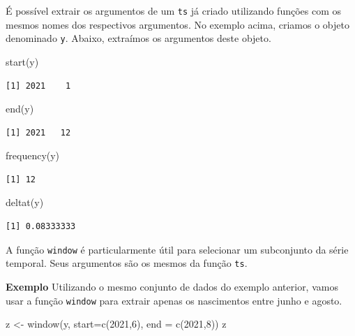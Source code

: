 \documentclass[
  letterpaper,
  DIV=11,
  numbers=noendperiod]{scrreprt}
\newenvironment{Shaded}{\begin{snugshade}}{\end{snugshade}}
\newcommand{\AttributeTok}[1]{\textcolor[rgb]{0.40,0.45,0.13}{#1}}
\newcommand{\DecValTok}[1]{\textcolor[rgb]{0.68,0.00,0.00}{#1}}
\newcommand{\FunctionTok}[1]{\textcolor[rgb]{0.28,0.35,0.67}{#1}}
\newcommand{\NormalTok}[1]{\textcolor[rgb]{0.00,0.23,0.31}{#1}}
\newcommand{\OtherTok}[1]{\textcolor[rgb]{0.00,0.23,0.31}{#1}}
\begin{document}
É possível extrair os argumentos de um \texttt{ts} já criado utilizando
funções com os mesmos nomes dos respectivos argumentos. No exemplo
acima, criamos o objeto denominado \texttt{y}. Abaixo, extraímos os
argumentos deste objeto.

\begin{Shaded}
\begin{Highlighting}[]
\FunctionTok{start}\NormalTok{(y)}
\end{Highlighting}
\end{Shaded}

\begin{verbatim}
[1] 2021    1
\end{verbatim}

\begin{Shaded}
\begin{Highlighting}[]
\FunctionTok{end}\NormalTok{(y)}
\end{Highlighting}
\end{Shaded}

\begin{verbatim}
[1] 2021   12
\end{verbatim}

\begin{Shaded}
\begin{Highlighting}[]
\FunctionTok{frequency}\NormalTok{(y)}
\end{Highlighting}
\end{Shaded}

\begin{verbatim}
[1] 12
\end{verbatim}

\begin{Shaded}
\begin{Highlighting}[]
\FunctionTok{deltat}\NormalTok{(y)}
\end{Highlighting}
\end{Shaded}

\begin{verbatim}
[1] 0.08333333
\end{verbatim}

A função \texttt{window} é particularmente útil para selecionar um
subconjunto da série temporal. Seus argumentos são os mesmos da função
\texttt{ts}.

\textbf{Exemplo} Utilizando o mesmo conjunto de dados do exemplo
anterior, vamos usar a função \texttt{window} para extrair apenas os
nascimentos entre junho e agosto.

\begin{Shaded}
\begin{Highlighting}[]
\NormalTok{z }\OtherTok{\textless{}{-}} \FunctionTok{window}\NormalTok{(y, }\AttributeTok{start=}\FunctionTok{c}\NormalTok{(}\DecValTok{2021}\NormalTok{,}\DecValTok{6}\NormalTok{), }\AttributeTok{end =} \FunctionTok{c}\NormalTok{(}\DecValTok{2021}\NormalTok{,}\DecValTok{8}\NormalTok{))}
\NormalTok{z}
\end{Highlighting}
\end{Shaded}
\end{document}
